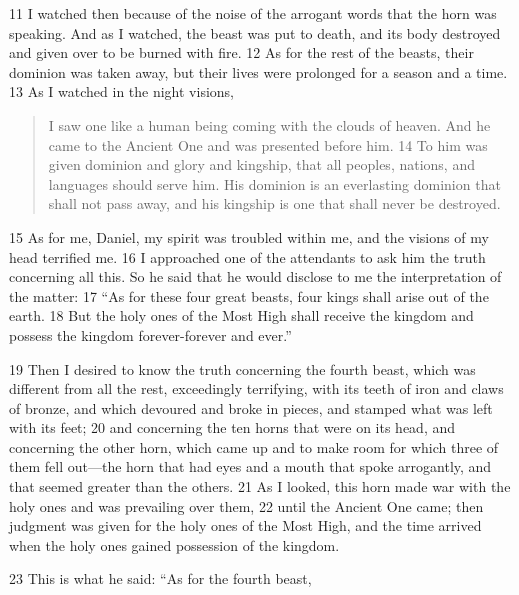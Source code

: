 11 I watched then because of the noise of the arrogant words that the horn was 
speaking. And as I watched, the beast was put to death, and its body destroyed 
and given over to be burned with fire. 12 As for the rest of the beasts, their 
dominion was taken away, but their lives were prolonged for a season and a time.
13 As I watched in the night visions,

\begin{verse}
I saw one like a human being
    coming with the clouds of heaven.
And he came to the Ancient One
    and was presented before him.
14 To him was given dominion
    and glory and kingship,
that all peoples, nations, and languages
    should serve him.
His dominion is an everlasting dominion
    that shall not pass away,
and his kingship is one
    that shall never be destroyed.
\end{verse}

15 As for me, Daniel, my spirit was troubled within me, and the visions of my 
head terrified me. 16 I approached one of the attendants to ask him the truth 
concerning all this. So he said that he would disclose to me the interpretation 
of the matter: 17 ``As for these four great beasts, four kings shall arise out of 
the earth. 18 But the holy ones of the Most High shall receive the kingdom and 
possess the kingdom forever-forever and ever.''

19 Then I desired to know the truth concerning the fourth beast, which was 
different from all the rest, exceedingly terrifying, with its teeth of iron and 
claws of bronze, and which devoured and broke in pieces, and stamped what was 
left with its feet; 20 and concerning the ten horns that were on its head, and 
concerning the other horn, which came up and to make room for which three of 
them fell out—the horn that had eyes and a mouth that spoke arrogantly, and that 
seemed greater than the others. 21 As I looked, this horn made war with the holy 
ones and was prevailing over them, 22 until the Ancient One came; then 
judgment was given for the holy ones of the Most High, and the time arrived when 
the holy ones gained possession of the kingdom.

23 This is what he said: ``As for the fourth beast,

